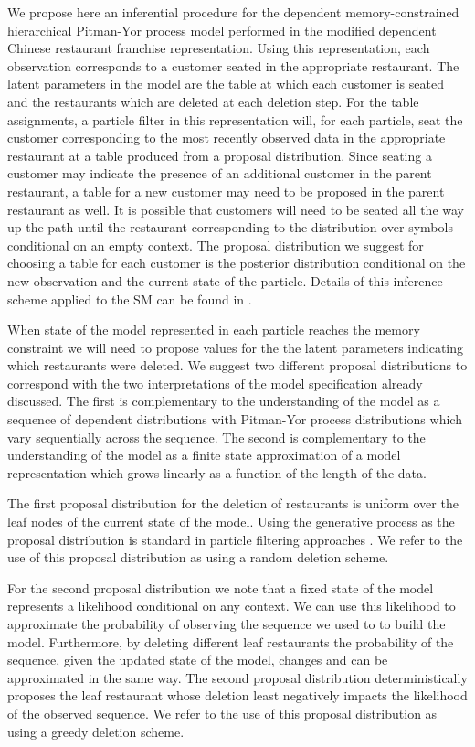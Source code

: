 We propose here an inferential procedure for the dependent memory-constrained hierarchical Pitman-Yor process model performed in the modified dependent Chinese restaurant franchise representation.  Using this representation, each observation corresponds to a customer seated in the appropriate restaurant.  The latent parameters in the model are the table at which each customer is seated and the restaurants which are deleted at each deletion step.  For the table assignments, a particle filter in this representation will, for each particle, seat the customer corresponding to the most recently observed data in the appropriate restaurant at a table produced from a proposal distribution.  Since seating a customer may indicate the presence of an additional customer in the parent restaurant, a table for a new customer may need to be proposed in the parent restaurant as well.  It is possible that customers will need to be seated all the way up the path until the restaurant corresponding to the distribution over symbols conditional on an empty context.  The proposal distribution we suggest for choosing a table for each customer is the posterior distribution conditional on the new observation and the current state of the particle.  Details of this inference scheme applied to the SM can be found in \cite{Gasthaus2010}.



When state of the model represented in each particle reaches the memory constraint we will need to propose values for the the latent parameters indicating which restaurants were deleted. We suggest two different proposal distributions to correspond with the two interpretations of the model specification already discussed.  The first is complementary to the understanding of the model as a sequence of dependent distributions with Pitman-Yor process distributions which vary sequentially across the sequence.  The second is complementary to the understanding of the model as a finite state approximation of a model representation which grows linearly as a function of the length of the data.

The first proposal distribution for the deletion of restaurants is uniform over the leaf nodes of the current state of the model.  Using the generative process as the proposal distribution is standard in particle filtering approaches \cite{Doucet2001}.  We refer to the use of this proposal distribution as using a random deletion scheme.

For the second proposal distribution we note that a fixed state of the model represents a likelihood conditional on any context.  We can use this likelihood to approximate the probability of observing the sequence we used to to build the model.  Furthermore, by deleting different leaf restaurants the probability of the sequence, given the updated state of the model, changes and can be approximated in the same way.  The second proposal distribution deterministically proposes the leaf restaurant whose deletion least negatively impacts the likelihood of the observed sequence.  We refer to the use of this proposal distribution as using a greedy deletion scheme. 

